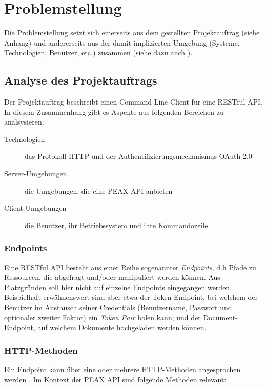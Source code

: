 \section{Problemstellung}

Die Problemstellung setzt sich einerseits aus dem gestellten Projektauftrag (siehe Anhang) und andererseits aus der damit implizierten Umgebung (Systeme, Technologien, Benutzer, etc.) zusammen (siehe dazu auch ).

\subsection{Analyse des Projektauftrags}

Der Projektauftrag beschreibt einen Command Line Client für eine RESTful API. In diesem Zusammenhang gibt es Aspekte aus folgenden Bereichen zu analsysieren:

\begin{description}
    \item[Technologien] das Protokoll HTTP und der Authentifizierungsmechanismus OAuth 2.0
    \item[Server-Umgebungen] die Umgebungen, die eine PEAX API anbieten
    \item[Client-Umgebungen] die Benutzer, ihr Betriebssystem und ihre Kommandozeile
\end{description}

\subsubsection{Endpoints}

Eine RESTful API besteht aus einer Reihe sogenannter \textit{Endpoints}, d.h Pfade zu Ressourcen, die abgefragt und/oder manipuliert werden können. Aus Platzgründen soll hier nicht auf einzelne Endpoints eingegangen werden. Beispielhaft erwähnenswert sind aber etwa der Token-Endpoint, bei welchem der Benutzer im Austausch seiner Credentials (Benutzername, Passwort und optionaler zweiter Faktor) ein \textit{Token Pair} holen kann; und der Document-Endpoint, auf welchem Dokumente hochgeladen werden können.

\subsubsection{HTTP-Methoden}

Ein Endpoint kann über eine oder mehrere HTTP-Methoden angesprochen werden \cite[Abschnitt 4.3]{RFC7231}. Im Kontext der PEAX API sind folgende Methoden relevant:

